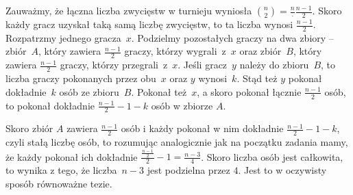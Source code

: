 \noindent
Zauważmy, że łączna liczba zwycięstw w turnieju wyniosła ${{n}\choose{2}} = \frac{n} \cdot \frac{n - 1}{2}$. Skoro każdy gracz uzyskał taką samą liczbę zwycięstw, to ta liczba wynosi $\frac{n - 1}{2}$.
Rozpatrzmy jednego gracza~$x$. Podzielmy pozostałych graczy na dwa zbiory -- zbiór~$A$, który zawiera $\frac{n - 1}{2}$ graczy, którzy wygrali~z~$x$ oraz zbiór~$B$, który zawiera $\frac{n - 1}{2}$ graczy, którzy przegrali~z~$x$. 
Jeśli gracz~$y$ należy do zbioru~$B$, to liczba graczy pokonanych przez obu~$x$ oraz $y$ wynosi~$k$. Stąd też $y$ pokonał dokładnie~$k$ osób ze zbioru~$B$. Pokonał też~$x$, a skoro pokonał łącznie $\frac{n - 1}{2}$ osób, to pokonał dokładnie $\frac{n - 1}{2} - 1 - k$ osób w zbiorze $A$.

\begin{center}
\end{center}

\vspace{10px}
\noindent
Skoro zbiór $A$ zawiera $\frac{n - 1}{2}$ osób i każdy pokonał w nim dokładnie $\frac{n - 1}{2} - 1 - k$, czyli stałą liczbę osób, to rozumując analogicznie jak na początku zadania mamy, że każdy pokonał ich dokładnie $\frac{\frac{n - 1}{2}}{2} - 1 = \frac{n - 3}{4}$. Skoro liczba osób jest całkowita, to wynika z tego, że liczba~$n - 3$ jest podzielna przez $4$. Jest to w oczywisty sposób równoważne tezie.

